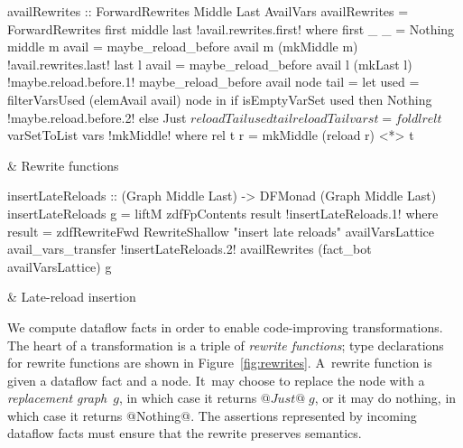 \documentclass[blockstyle,preprint,natbib,nocopyrightspace]{sigplanconf}
\newcommand{\authornote}[1]{{\em #1}}
\def\authornote#1{\unskip\relax}
\newcommand{\simon}[1]{\authornote{SLPJ: #1}}
\newcommand\figref[1]{Figure~\ref{fig:#1}}
\newcommand\figlabel[1]{\label{fig:#1}}
\begin{document}
\begin{figure*}
\begin{codetable}
\T\begin{code}
availRewrites :: ForwardRewrites Middle Last AvailVars
availRewrites = ForwardRewrites first middle last
!avail.rewrites.first!  where first _ _ = Nothing
        middle m avail = maybe_reload_before avail m (mkMiddle m)
!avail.rewrites.last!        last   l avail = maybe_reload_before avail l (mkLast l)
!maybe.reload.before.1!        maybe_reload_before avail node tail =
            let used = filterVarsUsed (elemAvail avail) node
            in  if isEmptyVarSet used then Nothing
!maybe.reload.before.2!                else Just $ reloadTail used tail
        reloadTail vars t = foldl rel t $ varSetToList vars
!mkMiddle!          where rel t r = mkMiddle (reload r) <*> t
\end{code}
\B
& Rewrite \mbox{functions}\\
\hline

\T\begin{code}
insertLateReloads :: (Graph Middle Last) -> DFMonad (Graph Middle Last)
insertLateReloads g = liftM zdfFpContents result
!insertLateReloads.1!  where result = zdfRewriteFwd RewriteShallow "insert late reloads"
                               availVarsLattice avail_vars_transfer
!insertLateReloads.2!                               availRewrites (fact_bot availVarsLattice) g
\end{code}
& Late-reload insertion\\
\end{codetable}
\caption{Late-reload insertion, which relies on the analysis of \figref{avail}}
\figlabel{avail-rewrites}
\end{figure*}


We compute dataflow facts in order to enable code-improving
transformations. \simon{Our library provides a function
that performs (interleaved) analysis and transformation on the
graph, which we describe in this section. New paragraph.}
The heart of a transformation is a triple of
\emph{rewrite functions};
type declarations for rewrite functions are
shown in \figref{rewrites}. 
%
A~rewrite function is given a dataflow fact and a node.
It~may choose to replace the node with a \emph{replacement graph}~$g$,
in which case it 
returns $@Just@\;g$, or it may do nothing, in which case it returns @Nothing@.
The assertions represented by incoming dataflow facts must 
ensure that the
rewrite preserves semantics.
\simon{I'm still wholly unclear about whether this is enough; 
doesn't the rewrite have to be monotonic wrt the analysis?
See my earlier example.}
\end{document}
